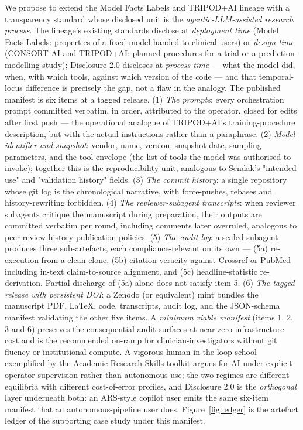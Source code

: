 \documentclass[11pt,a4paper]{article}
\begin{document}
We propose to extend the Model Facts Labels and TRIPOD+AI lineage with a transparency standard whose disclosed unit is the \emph{agentic-LLM-assisted research process}. The lineage's existing standards disclose at \emph{deployment time} (Model Facts Labels: properties of a fixed model handed to clinical users) or \emph{design time} (CONSORT-AI and TRIPOD+AI: planned procedures for a trial or a prediction-modelling study); Disclosure 2.0 discloses at \emph{process time} --- what the model did, when, with which tools, against which version of the code --- and that temporal-locus difference is precisely the gap, not a flaw in the analogy. The published manifest is six items at a tagged release. (1) \emph{The prompts}: every orchestration prompt committed verbatim, in order, attributed to the operator, closed for edits after first push --- the operational analogue of TRIPOD+AI's training-procedure description, but with the actual instructions rather than a paraphrase. (2) \emph{Model identifier and snapshot}: vendor, name, version, snapshot date, sampling parameters, and the tool envelope (the list of tools the model was authorised to invoke); together this is the reproducibility unit, analogous to Sendak's "intended use" and "validation history" fields. (3) \emph{The commit history}: a single repository whose git log is the chronological narrative, with force-pushes, rebases and history-rewriting forbidden. (4) \emph{The reviewer-subagent transcripts}: when reviewer subagents critique the manuscript during preparation, their outputs are committed verbatim per round, including comments later overruled, analogous to peer-review-history publication policies. (5) \emph{The audit log}: a sealed subagent produces three sub-artefacts, each compliance-relevant on its own --- (5a) re-execution from a clean clone, (5b) citation veracity against Crossref or PubMed including in-text claim-to-source alignment, and (5c) headline-statistic re-derivation. Partial discharge of (5a) alone does not satisfy item 5. (6) \emph{The tagged release with persistent DOI}: a Zenodo (or equivalent) mint bundles the manuscript PDF, LaTeX, code, transcripts, audit log, and the JSON-schema manifest validating the other five items. A \emph{minimum viable manifest} (items 1, 2, 3 and 6) preserves the consequential audit surfaces at near-zero infrastructure cost and is the recommended on-ramp for clinician-investigators without git fluency or institutional compute. A vigorous human-in-the-loop school exemplified by the Academic Research Skills toolkit\citep{ars2026} argues for AI under explicit operator supervision rather than autonomous use; the two regimes are different equilibria with different cost-of-error profiles, and Disclosure 2.0 is the \emph{orthogonal} layer underneath both: an ARS-style copilot user emits the same six-item manifest that an autonomous-pipeline user does. Figure~\ref{fig:ledger} is the artefact ledger of the supporting case study under this manifest.
\end{document}
